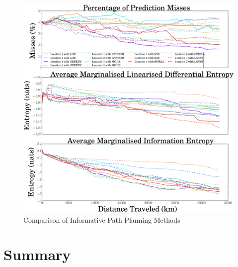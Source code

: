 			\begin{figure}[!htbp]
			\centering
				\includegraphics[width = \linewidth]{Figures/compare_methods.eps}
			\caption{Comparison of Informative Path Planning Methods}
			\label{Figure:CompareMethods}
			\end{figure}
				
	\section{Summary}